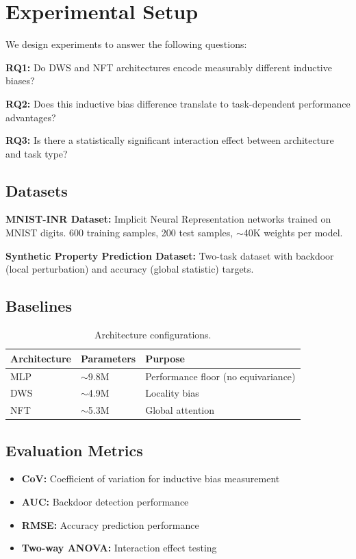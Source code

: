 \section{Experimental Setup}

We design experiments to answer the following questions:

\textbf{RQ1:} Do DWS and NFT architectures encode measurably different inductive biases?

\textbf{RQ2:} Does this inductive bias difference translate to task-dependent performance advantages?

\textbf{RQ3:} Is there a statistically significant interaction effect between architecture and task type?

\subsection{Datasets}

\textbf{MNIST-INR Dataset:} Implicit Neural Representation networks trained on MNIST digits. 600 training samples, 200 test samples, $\sim$40K weights per model.

\textbf{Synthetic Property Prediction Dataset:} Two-task dataset with backdoor (local perturbation) and accuracy (global statistic) targets.

\subsection{Baselines}

\begin{table}[t]
    \centering
    \caption{Architecture configurations.}
    \label{tab:baselines}
    \begin{tabular}{@{}lll@{}}
        \toprule
        Architecture & Parameters & Purpose \\
        \midrule
        MLP & $\sim$9.8M & Performance floor (no equivariance) \\
        DWS & $\sim$4.9M & Locality bias \\
        NFT & $\sim$5.3M & Global attention \\
        \bottomrule
    \end{tabular}
\end{table}

\subsection{Evaluation Metrics}

\begin{itemize}
    \item \textbf{CoV:} Coefficient of variation for inductive bias measurement
    \item \textbf{AUC:} Backdoor detection performance
    \item \textbf{RMSE:} Accuracy prediction performance
    \item \textbf{Two-way ANOVA:} Interaction effect testing
\end{itemize}
